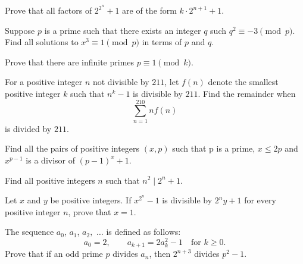 \documentclass{article}
\begin{document}
\begin{prob}[Euler]{3}
Prove that all factors of $2^{2^{n}} + 1$ are of the form $k \cdot 2^{n+1} + 1.$
\end{prob}

\begin{req}[]{4}
Suppose $p$ is a prime such that there exists an integer $q$ such $q^2 \equiv -3 \pmod{p}.$ Find all solutions to $x^3 \equiv 1 \pmod{p}$ in terms of $p$ and $q.$
\end{req}

\begin{prob}{6}
Prove that there are infinite primes $p\equiv 1\pmod{k}.$
\end{prob}

\begin{prob}[DIME 2020/14]{6}
For a positive integer $n$ not divisible by $211$, let $f(n)$ denote the smallest positive integer $k$ such that $n^k - 1$ is divisible by $211$. Find the remainder when $$\sum_{n=1}^{210} nf(n)$$ is divided by $211$.
\end{prob}

\begin{prob}[IMO 1999/4]{6}
Find all the pairs of positive integers $(x,p)$ such that p is a prime, $x \leq 2p$ and $x^{p-1}$ is a divisor of $ (p-1)^{x}+1$.
\end{prob}

\begin{prob}[IMO 1990/3]{9}
Find all positive integers $n$ such that $n^2 \mid 2^n+1.$
\end{prob}

\begin{prob}[ISL 2012/N6]{9}
Let $x$ and $y$ be positive integers. If ${x^{2^n}}-1$ is divisible by $2^ny+1$ for every positive integer $n$, prove that $x=1$.
\end{prob}

\begin{prob}[ISL 2003/N7]{13}
The sequence $a_0$, $a_1$, $a_2,$ $\ldots$ is defined as follows:
\[a_0=2, \qquad a_{k+1}=2a_k^2-1 \quad\text{for }k \geq 0.\]
Prove that if an odd prime $p$ divides $a_n$, then $2^{n+3}$ divides $p^2-1$.
\end{prob}

\end{document}
